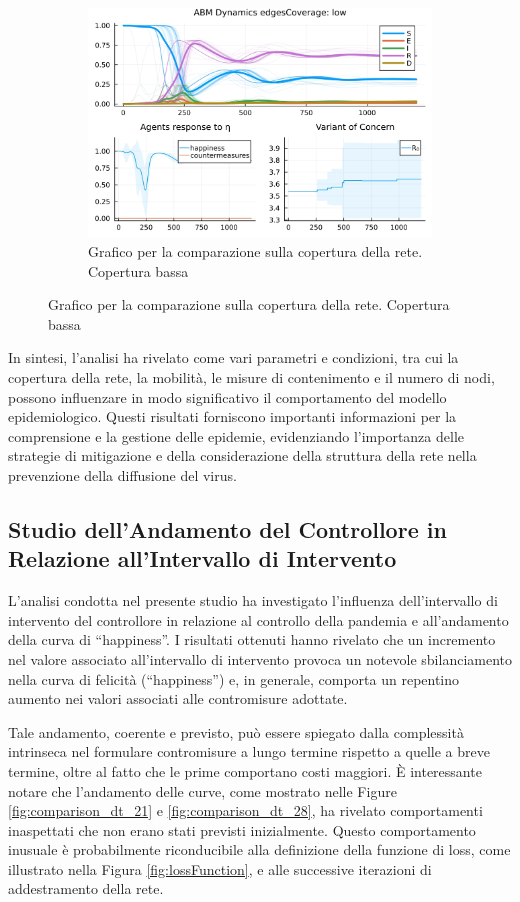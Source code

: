 \begin{figure}[H]
\begin{subfigure}[b]{0.3\textwidth}
		\includegraphics[width=\textwidth]{img/SocialNetworkABM_3_EC.jpg}
		\caption{Grafico per la comparazione sulla copertura della rete. Copertura bassa}
		\label{fig:comparison_lowCoverage}
	\end{subfigure}
\end{figure}

In sintesi, l'analisi ha rivelato come vari parametri e condizioni, 
tra cui la copertura della rete, la mobilità, le misure di contenimento 
e il numero di nodi, possono influenzare in modo significativo il 
comportamento del modello epidemiologico. Questi risultati forniscono 
importanti informazioni per la comprensione e la gestione delle epidemie, 
evidenziando l'importanza delle strategie di mitigazione e della 
considerazione della struttura della rete nella prevenzione della 
diffusione del virus.
\newpage

\subsection{Studio dell'Andamento del Controllore in Relazione all'Intervallo di Intervento}
L'analisi condotta nel presente studio ha investigato l'influenza 
dell'intervallo di intervento del controllore in relazione al controllo 
della pandemia e all'andamento della curva di ``happiness''. I risultati 
ottenuti hanno rivelato che un incremento nel valore associato 
all'intervallo di intervento provoca un notevole sbilanciamento nella 
curva di felicità (``happiness'') e, in generale, comporta un repentino 
aumento nei valori associati alle contromisure adottate.

Tale andamento, coerente e previsto, può essere spiegato dalla 
complessità intrinseca nel formulare contromisure a lungo termine 
rispetto a quelle a breve termine, oltre al fatto che le prime 
comportano costi maggiori. È interessante notare che l'andamento delle 
curve, come mostrato nelle Figure \ref{fig:comparison_dt_21} e 
\ref{fig:comparison_dt_28}, ha rivelato comportamenti inaspettati che 
non erano stati previsti inizialmente. Questo comportamento inusuale è 
probabilmente riconducibile alla definizione della funzione di loss, 
come illustrato nella Figura \ref{fig:lossFunction}, e alle successive 
iterazioni di addestramento della rete.


